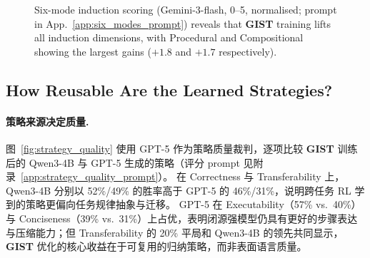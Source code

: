 \documentclass[11pt]{article}
\newcommand{\gist}{\textbf{GIST}}
\begin{document}
\begin{figure}[h!]
{%
  }
  \caption{Six-mode induction scoring (Gemini-3-flash, 0--5, normalised;
    prompt in App.~\ref{app:six_modes_prompt}) reveals that \gist{} training
    lifts all induction dimensions, with Procedural and Compositional
    showing the largest gains ($+1.8$ and $+1.7$ respectively).}
  \label{fig:category_radar}
\end{figure}

\subsection{How Reusable Are the Learned Strategies?}
\label{sec:reusability}

\paragraph{策略来源决定质量.}
图~\ref{fig:strategy_quality} 使用 GPT-5 作为策略质量裁判，逐项比较 \gist{} 训练后的 Qwen3-4B 与 GPT-5 生成的策略（评分 prompt 见附录~\ref{app:strategy_quality_prompt}）。
在 Correctness 与 Transferability 上，Qwen3-4B 分别以 52\%/49\% 的胜率高于 GPT-5 的 46\%/31\%，说明跨任务 RL 学到的策略更偏向任务规律抽象与迁移。
GPT-5 在 Executability（57\% vs.\ 40\%）与 Conciseness（39\% vs.\ 31\%）上占优，表明闭源强模型仍具有更好的步骤表达与压缩能力；但 Transferability 的 20\% 平局和 Qwen3-4B 的领先共同显示，\gist{} 优化的核心收益在于可复用的归纳策略，而非表面语言质量。
\end{document}
